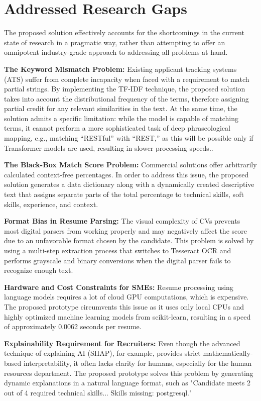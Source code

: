 \section{Addressed Research Gaps}
The proposed solution effectively accounts for the shortcomings in the current state of research in a pragmatic way, rather than attempting to offer an omnipotent industry-grade approach to addressing all problems at hand.

\textbf{The Keyword Mismatch Problem:} Existing applicant tracking systems (ATS) suffer from complete incapacity when faced with a requirement to match partial strings. By implementing the TF-IDF technique, the proposed solution takes into account the distributional frequency of the terms, therefore assigning partial credit for any relevant similarities in the text. At the same time, the solution admits a specific limitation: while the model is capable of matching terms, it cannot perform a more sophisticated task of deep phraseological mapping, e.g., matching “RESTful” with “REST,” as this will be possible only if Transformer models are used, resulting in slower processing speeds..

\textbf{The Black-Box Match Score Problem:} Commercial solutions offer arbitrarily calculated context-free percentages. In order to address this issue, the proposed solution generates a data dictionary along with a dynamically created descriptive text that assigns separate parts of the total percentage to technical skills, soft skills, experience, and context.

\textbf{Format Bias in Resume Parsing:} The visual complexity of CVs prevents most digital parsers from working properly and may negatively affect the score due to an unfavorable format chosen by the candidate. This problem is solved by using a multi-step extraction process that switches to Tesseract OCR and performs grayscale and binary conversions when the digital parser fails to recognize enough text.

\textbf{Hardware and Cost Constraints for SMEs:} Resume processing using language models requires a lot of cloud GPU computations, which is expensive. The proposed prototype circumvents this issue as it uses only local CPUs and highly optimized machine learning models from scikit-learn, resulting in a speed of approximately 0.0062 seconds per resume.

\textbf{Explainability Requirement for Recruiters:} Even though the advanced technique of explaining AI (SHAP), for example, provides strict mathematically-based interpretability, it often lacks clarity for humans, especially for the human resources department. The proposed prototype solves this problem by generating dynamic explanations in a natural language format, such as "Candidate meets 2 out of 4 required technical skills... Skills missing: postgresql."
